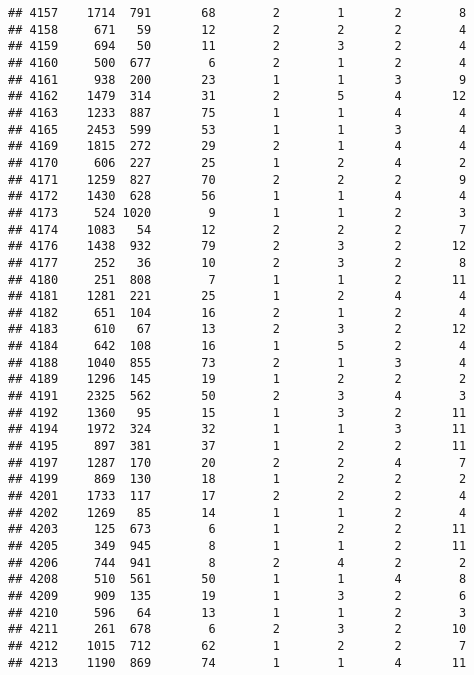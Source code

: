 \documentclass[]{article}
\begin{document}
\begin{verbatim}
## 4157    1714  791       68        2        1       2        8
## 4158     671   59       12        2        2       2        4
## 4159     694   50       11        2        3       2        4
## 4160     500  677        6        2        1       2        4
## 4161     938  200       23        1        1       3        9
## 4162    1479  314       31        2        5       4       12
## 4163    1233  887       75        1        1       4        4
## 4165    2453  599       53        1        1       3        4
## 4169    1815  272       29        2        1       4        4
## 4170     606  227       25        1        2       4        2
## 4171    1259  827       70        2        2       2        9
## 4172    1430  628       56        1        1       4        4
## 4173     524 1020        9        1        1       2        3
## 4174    1083   54       12        2        2       2        7
## 4176    1438  932       79        2        3       2       12
## 4177     252   36       10        2        3       2        8
## 4180     251  808        7        1        1       2       11
## 4181    1281  221       25        1        2       4        4
## 4182     651  104       16        2        1       2        4
## 4183     610   67       13        2        3       2       12
## 4184     642  108       16        1        5       2        4
## 4188    1040  855       73        2        1       3        4
## 4189    1296  145       19        1        2       2        2
## 4191    2325  562       50        2        3       4        3
## 4192    1360   95       15        1        3       2       11
## 4194    1972  324       32        1        1       3       11
## 4195     897  381       37        1        2       2       11
## 4197    1287  170       20        2        2       4        7
## 4199     869  130       18        1        2       2        2
## 4201    1733  117       17        2        2       2        4
## 4202    1269   85       14        1        1       2        4
## 4203     125  673        6        1        2       2       11
## 4205     349  945        8        1        1       2       11
## 4206     744  941        8        2        4       2        2
## 4208     510  561       50        1        1       4        8
## 4209     909  135       19        1        3       2        6
## 4210     596   64       13        1        1       2        3
## 4211     261  678        6        2        3       2       10
## 4212    1015  712       62        1        2       2        7
## 4213    1190  869       74        1        1       4       11

\end{verbatim}
\end{document}
